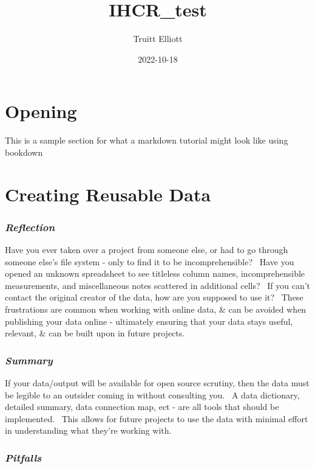 \documentclass[
]{book}
\title{IHCR\_test}
\author{Truitt Elliott}
\date{2022-10-18}
\begin{document}
\maketitle

{
\setcounter{tocdepth}{1}
\tableofcontents
}
\hypertarget{opening}{%
\chapter{Opening}\label{opening}}

This is a sample section for what a markdown tutorial might look like using bookdown

\hypertarget{reusable}{%
\chapter{Creating Reusable Data}\label{reusable}}

\hypertarget{reflection}{%
\subsection{\texorpdfstring{\emph{Reflection}}{Reflection}}\label{reflection}}

Have you ever taken over a project from someone else, or had to go through someone else's file system - only to find it to be incomprehensible?~ Have you opened an unknown spreadsheet to see titleless column names, incomprehensible measurements, and miscellaneous notes scattered in additional cells?~ If you can't contact the original creator of the data, how are you supposed to use it?~ These frustrations are common when working with online data, \& can be avoided when publishing your data online - ultimately ensuring that your data stays useful, relevant, \& can be built upon in future projects.

\hypertarget{summary}{%
\subsection{\texorpdfstring{\emph{Summary}}{Summary}}\label{summary}}

If your data/output will be available for open source scrutiny, then the data must be legible to an outsider coming in without consulting you.~ A data dictionary, detailed summary, data connection map, ect - are all tools that should be implemented.~ This allows for future projects to use the data with minimal effort in understanding what they're working with.~~~

\hypertarget{pitfalls}{%
\subsection{\texorpdfstring{\emph{Pitfalls}}{Pitfalls}}\label{pitfalls}}
\end{document}
